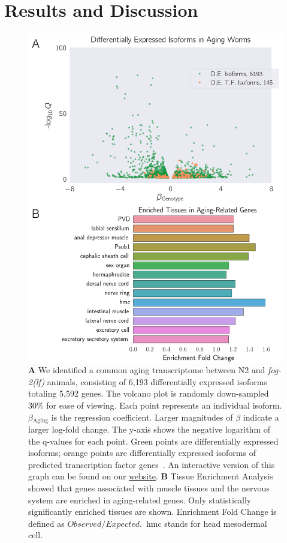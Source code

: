 \documentclass[10pt,letterpaper,twocolumn]{article}
\newcommand{\fog}{\emph{\mbox{fog-2(lf)}}}
\newcommand{\agen}{5,592}
\newcommand{\webref}{
\href{https://wormlabcaltech.github.io/Angeles_Leighton_2016/}{website}}
\begin{document}
\section*{Results and Discussion}
\begin{figure}[htbp]
\renewcommand{\familydefault}{\sfdefault}\normalfont{}
\centering
\includegraphics[width=\linewidth]{../../output/figs/final_figs/aging_transcriptomics.pdf}
\caption{
\textbf{A} We identified a common aging transcriptome between N2 and
\fog{} animals, consisting of 6,193 differentially expressed isoforms totaling
\agen{} genes. The volcano plot is randomly down-sampled 30\% for ease of
viewing. Each point represents an individual isoform. $\beta{}_\mathrm{Aging}$
is the regression coefficient. Larger magnitudes of $\beta$ indicate a larger
log-fold change. The y-axis shows the negative logarithm of the q-values for
each point. Green points are differentially expressed isoforms; orange points
are differentially expressed isoforms of  predicted transcription factor
genes~\cite{Reece-Hoyes2005}. An interactive version of this graph can be found
on our \webref{}.
\textbf{B} Tissue Enrichment Analysis~\cite{Angeles-Albores2016} showed that
genes associated with muscle tissues and the nervous system are enriched in
aging-related genes. Only statistically significantly enriched tissues are shown.
Enrichment Fold Change is defined as $Observed/Expected$.\ hmc stands for head
mesodermal cell.
}
\label{fig:agingtranscriptome}
\end{figure}
\end{document}
